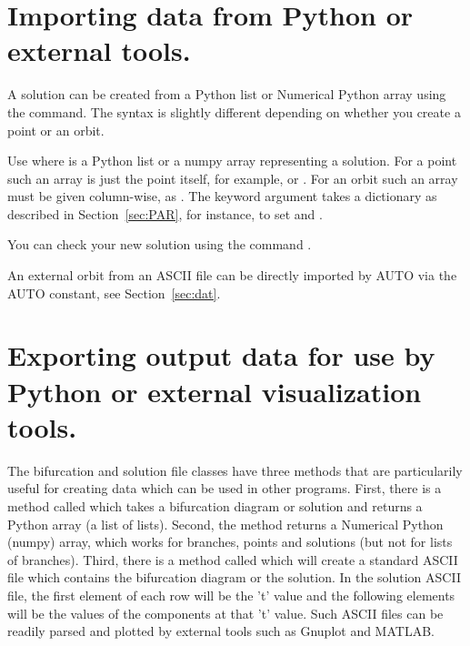 \documentclass[12pt]{report}
\begin{document}
 \section{ Importing data from Python or external tools.} \label{sec:clui_importing}
 A solution can be created from a Python list or Numerical Python
 array using the  command. The syntax is slightly
 different depending on whether you create a point or an orbit.

 Use  where  is a Python list
 or a numpy array representing a solution. For a point
 such an array is just the point itself, for example,
  or
 . For an orbit such an array must be given
 column-wise, as .
 The  keyword argument takes a dictionary 
 as described in Section~\ref{sec:PAR}, for instance,  to set  and .

 You can check your new solution using the command .

 An external orbit from an ASCII file can be directly imported by
 AUTO via the  AUTO constant, see Section~\ref{sec:dat}.

 \section{ Exporting output data for use by Python or external
   visualization tools.} \label{sec:clui_exporting}

 The bifurcation and solution file classes have three methods that are 
 particularily useful for creating data which can be used in other
 programs.  First, there is a method called  which
 takes a bifurcation diagram or solution and
 returns a Python array (a list of lists). Second, the method
  returns a Numerical Python (numpy) array,
 which works for
 branches, points and solutions (but not for lists of branches).
 Third, there is a method called
  which will create a standard ASCII file
 which contains the bifurcation diagram or the solution. 
 In the solution ASCII file, the first element of each row will be
 the 't' value and the following elements will be the
 values of the components at that 't' value. Such ASCII files
 can be readily parsed and plotted by external tools such as
 Gnuplot and MATLAB.
\end{document}
